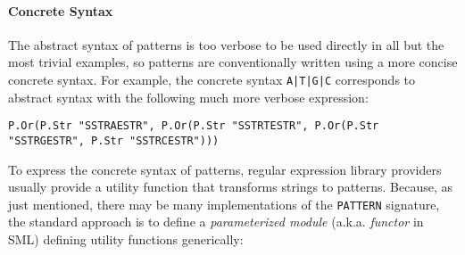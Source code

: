 \paragraph{Concrete Syntax} The abstract syntax of patterns is too verbose to be used directly in all but the most trivial examples, so patterns are conventionally written using a more concise concrete syntax. For example, the concrete syntax \lstinline{A|T|G|C} corresponds to abstract syntax with the following much more verbose expression:
\begin{lstlisting}[numbers=none,mathescape=|]
P.Or(P.Str "SSTRAESTR", P.Or(P.Str "SSTRTESTR", P.Or(P.Str "SSTRGESTR", P.Str "SSTRCESTR")))
\end{lstlisting} 





To express the concrete syntax of patterns, regular expression library providers usually provide a utility function that transforms strings to patterns. Because, as just mentioned, there  may be many implementations of the \lstinline{PATTERN} signature, the standard approach is to define a \emph{parameterized module} (a.k.a. \emph{functor} in SML) defining utility functions generically:

